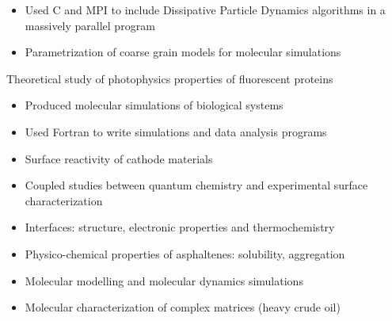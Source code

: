 \documentclass[10pt,a4paper,ragged2e,academicons]{altacv}
\begin{document}
\divider

\begin{itemize}
\item Used C and MPI to include Dissipative Particle Dynamics algorithms in a massively parallel program
\item Parametrization of coarse grain models for molecular simulations
\end{itemize}

\divider

Theoretical study of photophysics properties of fluorescent proteins
\smallskip
\begin{itemize}
\item Produced molecular simulations of biological systems
\item Used Fortran to write simulations and data analysis programs
\end{itemize}



\vspace{-1mm}
\begin{itemize}
\item Surface reactivity of cathode materials
\item Coupled studies between quantum chemistry and experimental surface characterization
\item Interfaces: structure, electronic properties and thermochemistry
\end{itemize}

\divider

\vspace{-1mm}
\begin{itemize}
\item Physico-chemical properties of asphaltenes: solubility, aggregation
\item Molecular modelling and molecular dynamics simulations
\item Molecular characterization of complex matrices (heavy crude oil)
\end{itemize}

\divider
\end{document}
